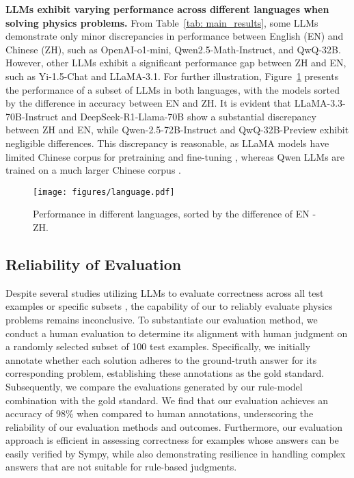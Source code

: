 \textbf{LLMs exhibit varying performance across different languages when solving physics problems.}
From Table~\ref{tab: main_results}, some LLMs demonstrate only minor discrepancies in performance between English (EN) and Chinese (ZH), such as OpenAI-o1-mini, Qwen2.5-Math-Instruct, and QwQ-32B. 
However, other LLMs exhibit a significant performance gap between ZH and EN, such as Yi-1.5-Chat and LLaMA-3.1.
For further illustration, Figure~\ref{fig:language} presents the performance of a subset of LLMs in both languages, with the models sorted by the difference in accuracy between EN and ZH. 
It is evident that LLaMA-3.3-70B-Instruct and DeepSeek-R1-Llama-70B show a substantial discrepancy between ZH and EN, while Qwen-2.5-72B-Instruct and QwQ-32B-Preview exhibit negligible differences.
This discrepancy is reasonable, as LLaMA models have limited Chinese corpus for pretraining and fine-tuning \citep{llama312024dubey}, whereas Qwen LLMs are trained on a much larger Chinese corpus \citep{qwen252024Yang, Qwen25Math2024Yang}.



\begin{figure}
    \centering
    \texttt{[image: figures/language.pdf]}
    \caption{Performance in different languages, sorted by the difference of EN - ZH.}
    \label{fig:language}
\end{figure}





\subsection{Reliability of Evaluation}\label{sec: human_eval}

Despite several studies utilizing LLMs to evaluate correctness across all test examples \citep{omnimath2024gao} or specific subsets \citep{GaokaoBench2023zhang}, the capability of our {\judge} to reliably evaluate physics problems remains inconclusive.
To substantiate our {\judge} evaluation method, we conduct a human evaluation to determine its alignment with human judgment on a randomly selected subset of 100 test examples. 
Specifically, we initially annotate whether each solution adheres to the ground-truth answer for its corresponding problem, establishing these annotations as the gold standard. 
Subsequently, we compare the evaluations generated by our rule-model combination with the gold standard.
We find that our {\judge} evaluation achieves an accuracy of 98\% when compared to human annotations, underscoring the reliability of our evaluation methods and outcomes. 
Furthermore, our evaluation approach is efficient in assessing correctness for examples whose answers can be easily verified by Sympy, while also demonstrating resilience in handling complex answers that are not suitable for rule-based judgments.


